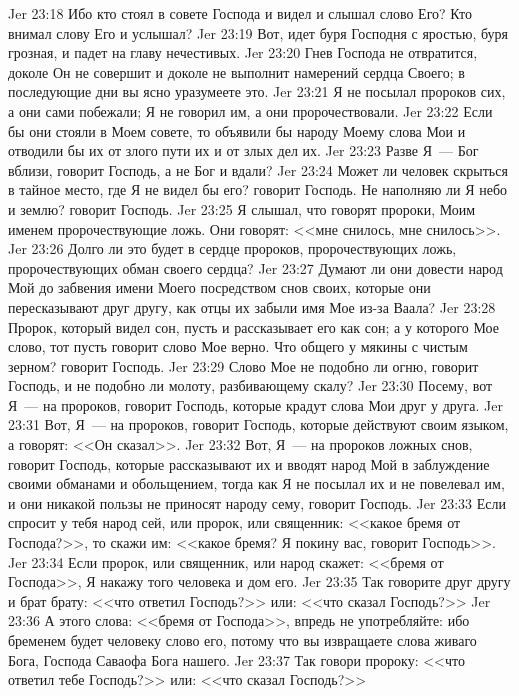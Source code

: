 \vs Jer 23:18 Ибо кто стоял в совете Господа и видел и слышал слово Его? Кто внимал слову Его и услышал?
\vs Jer 23:19 Вот, идет буря Господня с яростью, буря грозная, и падет на главу нечестивых.
\vs Jer 23:20 Гнев Господа не отвратится, доколе Он не совершит и доколе не выполнит намерений сердца Своего; в последующие дни вы ясно уразумеете это.
\vs Jer 23:21 Я не посылал пророков сих, а они сами побежали; Я не говорил им, а они пророчествовали.
\vs Jer 23:22 Если бы они стояли в Моем совете, то объявили бы народу Моему слова Мои и отводили бы их от злого пути их и от злых дел их.
\vs Jer 23:23 Разве Я~--- Бог  вблизи, говорит Господь, а не Бог и вдали?
\vs Jer 23:24 Может ли человек скрыться в тайное место, где Я не видел бы его? говорит Господь. Не наполняю ли Я небо и землю? говорит Господь.
\vs Jer 23:25 Я слышал, что говорят пророки, Моим именем пророчествующие ложь. Они говорят: <<мне снилось, мне снилось>>.
\vs Jer 23:26 Долго ли это будет в сердце пророков, пророчествующих ложь, пророчествующих обман своего сердца?
\vs Jer 23:27 Думают ли они довести народ Мой до забвения имени Моего посредством снов своих, которые они пересказывают друг другу, как отцы их забыли имя Мое из-за Ваала?
\vs Jer 23:28 Пророк, который видел сон, пусть и рассказывает его как сон; а у которого Мое слово, тот пусть говорит слово Мое верно. Что общего у мякины с чистым зерном? говорит Господь.
\vs Jer 23:29 Слово Мое не подобно ли огню, говорит Господь, и не подобно ли молоту, разбивающему скалу?
\vs Jer 23:30 Посему, вот Я~--- на пророков, говорит Господь, которые крадут слова Мои друг у друга.
\vs Jer 23:31 Вот, Я~--- на пророков, говорит Господь, которые действуют своим языком, а говорят: <<Он сказал>>.
\vs Jer 23:32 Вот, Я~--- на пророков ложных снов, говорит Господь, которые рассказывают их и вводят народ Мой в заблуждение своими обманами и обольщением, тогда как Я не посылал их и не повелевал им, и они никакой пользы не приносят народу сему, говорит Господь.
\vs Jer 23:33 Если спросит у тебя народ сей, или пророк, или священник: <<какое бремя от Господа?>>, то скажи им: <<какое бремя? Я покину вас, говорит Господь>>.
\vs Jer 23:34 Если пророк, или священник, или народ скажет: <<бремя от Господа>>, Я накажу того человека и дом его.
\vs Jer 23:35 Так говорите друг другу и брат брату: <<что ответил Господь?>> или: <<что сказал Господь?>>
\vs Jer 23:36 А этого слова: <<бремя от Господа>>, впредь не употребляйте: ибо бременем будет  человеку слово его, потому что вы извращаете слова живаго Бога, Господа Саваофа Бога нашего.
\vs Jer 23:37 Так говори пророку: <<что ответил тебе Господь?>> или: <<что сказал Господь?>>

